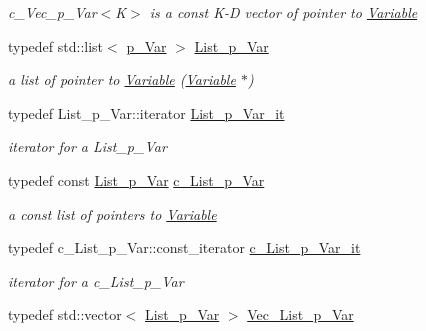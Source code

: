 \begin{DoxyCompactItemize}
\begin{DoxyCompactList}\small\item\em c\+\_\+\+Vec\+\_\+p\+\_\+\+Var$<$\+K$>$ is a const K-\/D vector of pointer to \mbox{\hyperlink{class_s_m_spp__di__unipi__it_1_1_variable}{Variable}} \end{DoxyCompactList}\item 
typedef std\+::list$<$ \mbox{\hyperlink{group___variable___t_y_p_e_s_ga85b661f10ca1c046c5f496678213981a}{p\+\_\+\+Var}} $>$ \mbox{\hyperlink{group___variable___t_y_p_e_s_ga1fccfcb7d57847e2b9ba2fa0c6100b80}{List\+\_\+p\+\_\+\+Var}}
\begin{DoxyCompactList}\small\item\em a list of pointer to \mbox{\hyperlink{class_s_m_spp__di__unipi__it_1_1_variable}{Variable}} (\mbox{\hyperlink{class_s_m_spp__di__unipi__it_1_1_variable}{Variable}} $\ast$) \end{DoxyCompactList}\item 
typedef List\+\_\+p\+\_\+\+Var\+::iterator \mbox{\hyperlink{group___variable___t_y_p_e_s_ga01b5f0523f638dd5836a17a6d5eb3d66}{List\+\_\+p\+\_\+\+Var\+\_\+it}}
\begin{DoxyCompactList}\small\item\em iterator for a List\+\_\+p\+\_\+\+Var \end{DoxyCompactList}\item 
typedef const \mbox{\hyperlink{group___variable___t_y_p_e_s_ga1fccfcb7d57847e2b9ba2fa0c6100b80}{List\+\_\+p\+\_\+\+Var}} \mbox{\hyperlink{group___variable___t_y_p_e_s_ga31b17209d66be7b60e6114541813bc43}{c\+\_\+\+List\+\_\+p\+\_\+\+Var}}
\begin{DoxyCompactList}\small\item\em a const list of pointers to \mbox{\hyperlink{class_s_m_spp__di__unipi__it_1_1_variable}{Variable}} \end{DoxyCompactList}\item 
typedef c\+\_\+\+List\+\_\+p\+\_\+\+Var\+::const\+\_\+iterator \mbox{\hyperlink{group___variable___t_y_p_e_s_gad262f9de9e10586f390bc7a2fc05edbc}{c\+\_\+\+List\+\_\+p\+\_\+\+Var\+\_\+it}}
\begin{DoxyCompactList}\small\item\em iterator for a c\+\_\+\+List\+\_\+p\+\_\+\+Var \end{DoxyCompactList}\item 
typedef std\+::vector$<$ \mbox{\hyperlink{group___variable___t_y_p_e_s_ga1fccfcb7d57847e2b9ba2fa0c6100b80}{List\+\_\+p\+\_\+\+Var}} $>$ \mbox{\hyperlink{group___variable___t_y_p_e_s_ga5c28c8956e72a58b668b86adad8c7805}{Vec\+\_\+\+List\+\_\+p\+\_\+\+Var}}

\end{DoxyCompactItemize}
